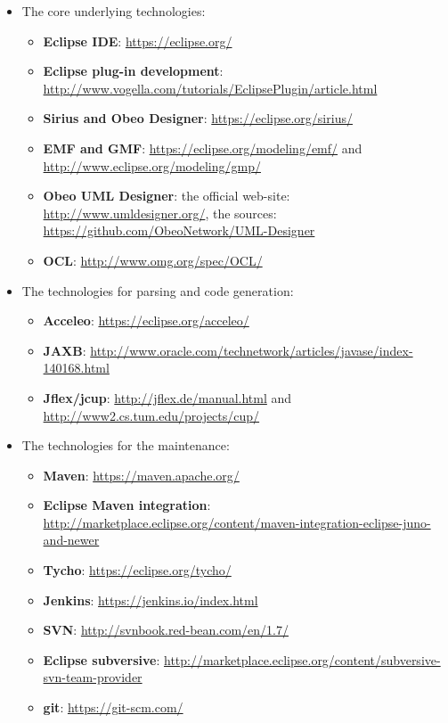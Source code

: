 \documentclass[12pt]{article}
\begin{document}
\begin{itemize}
\item
The core underlying technologies:
\begin{itemize}
\item
\textbf{Eclipse IDE}: \url{https://eclipse.org/}
\item
\textbf{Eclipse plug-in development}: \url{http://www.vogella.com/tutorials/EclipsePlugin/article.html}
\item
\textbf{Sirius and Obeo Designer}: \url{https://eclipse.org/sirius/}
\item
\textbf{EMF and GMF}: \url{https://eclipse.org/modeling/emf/} and \url{http://www.eclipse.org/modeling/gmp/}
\item
\textbf{Obeo UML Designer}: the official web-site: \url{http://www.umldesigner.org/}, the sources: \url{https://github.com/ObeoNetwork/UML-Designer} 
\item
\textbf{OCL}: \url{http://www.omg.org/spec/OCL/}
\end{itemize}

\item
The technologies for parsing and code generation:
\begin{itemize}
\item
\textbf{Acceleo}: \url{https://eclipse.org/acceleo/}
\item
\textbf{JAXB}: \url{http://www.oracle.com/technetwork/articles/javase/index-140168.html}
\item
\textbf{Jflex/jcup}: \url{http://jflex.de/manual.html} and \url{http://www2.cs.tum.edu/projects/cup/}
\end{itemize}

\item
The technologies for the maintenance:
\begin{itemize}
\item
\textbf{Maven}: \url{https://maven.apache.org/}
\item
\textbf{Eclipse Maven integration}: \url{http://marketplace.eclipse.org/content/maven-integration-eclipse-juno-and-newer}
\item
\textbf{Tycho}: \url{https://eclipse.org/tycho/}
\item
\textbf{Jenkins}: \url{https://jenkins.io/index.html}
\item
\textbf{SVN}: \url{http://svnbook.red-bean.com/en/1.7/}
\item
\textbf{Eclipse subversive}: \url{http://marketplace.eclipse.org/content/subversive-svn-team-provider}
\item
\textbf{git}: \url{https://git-scm.com/}
\end{itemize}


\end{itemize}
\end{document}
